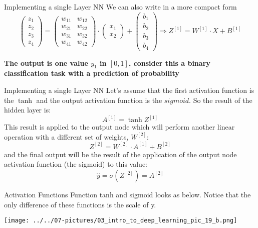 \documentclass[11pt]{beamer}
\begin{document}
\begin{frame}{Implementing a single Layer NN}
We can also write in a more compact form
\begin{equation}
\begin{pmatrix}
z_1 \\ z_2 \\ z_3 \\ z_4
\end{pmatrix} =
\begin{pmatrix}
w_{11} & w_{12} \\ w_{21} & w_{22} \\ w_{31} & w_{32} \\ w_{41} & w_{42}
\end{pmatrix} 
\cdot 
\begin{pmatrix}
x_1 \\ x_2 
\end{pmatrix}
+
\begin{pmatrix}
b_1 \\ b_2 \\ b_3 \\ b_4
\end{pmatrix} 
\Rightarrow Z^{[1]} = W^{[1]} \cdot X + B^{[1]} 
\end{equation}
\vspace{0.5cm}

\textbf{The output is one value $y_1$ in $[0, 1]$, consider this a binary classification task with a prediction of probability}
\end{frame}
\begin{frame}{Implementing a single Layer NN}
Let's assume that the first activation function is the $\tanh$ and the output activation function is the $sigmoid$. So the result of the hidden layer is:
$$ A^{[1]} = \tanh{Z^{[1]}} $$
This result is applied to the output node which will perform another linear operation with a different set of weights, $W^{[2]}$:
$$ Z^{[2]} = W^{[2]} \cdot A^{[1]} + B^{[2]} $$
and the final output will be the result of the application of the output node activation function (the sigmoid) to this value:
$$ \hat{y} = \sigma({Z^{[2]}}) = A^{[2]}$$
\end{frame}
\begin{frame}{Activation Functions}
Function tanh and sigmoid looks as below. Notice that the only difference of these functions is the scale of y.
	\begin{center}
	\texttt{[image: ../../07-pictures/03\_intro\_to\_deep\_learning\_pic\_19\_b.png]}
	\end{center}
\end{frame}
\end{document}
